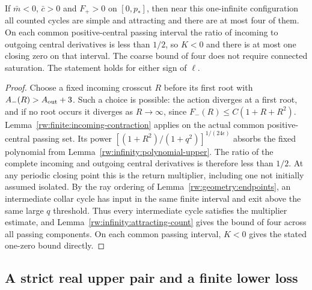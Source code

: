 \begin{proposition}
\label{rw:infinity:negative-regular}
If $\bar m<0$, $\bar c>0$ and $F_+>0$ on $[0,p_*]$, then
near this one-infinite configuration all counted cycles are simple
and attracting and there are at most four of them. On each common
positive-central passing interval the ratio of incoming to outgoing
central derivatives is less than $1/2$, so $K<0$ and there is at most
one closing zero on that interval. The coarse bound of four does not
require connected saturation. The statement holds for either sign of $\ell$.
\end{proposition}
\begin{proof}
Choose a fixed incoming crosscut $R$ before its first root with
$A_-(R)>A_{\rm out}+3$. Such a choice is possible: the action
diverges at a first root, and if no root occurs it diverges as
$R\to\infty$, since $F_-(R)\le C(1+R+R^2)$.
Lemma~\ref{rw:finite:incoming-contraction} applies on the actual
common positive-central passing set. Its power
$[(1+R^2)/(1+q^2)]^{1/(24\epsilon)}$ absorbs the fixed polynomial
from Lemma~\ref{rw:infinity:polynomial-upper}. The ratio of the
complete incoming and outgoing central derivatives is therefore
less than $1/2$. At any periodic closing point this is the return
multiplier, including one not initially assumed isolated.
By the ray ordering of Lemma~\ref{rw:geometry:endpoints}, an
intermediate collar cycle has input in the same finite interval and
exit above the same large $q$ threshold. Thus every intermediate
cycle satisfies the multiplier estimate, and
Lemma~\ref{rw:infinity:attracting-count} gives the bound of four
across all passing components. On each common passing interval,
$K<0$ gives the stated one-zero bound directly.
\end{proof}

\subsection{A strict real upper pair and a finite lower loss}

